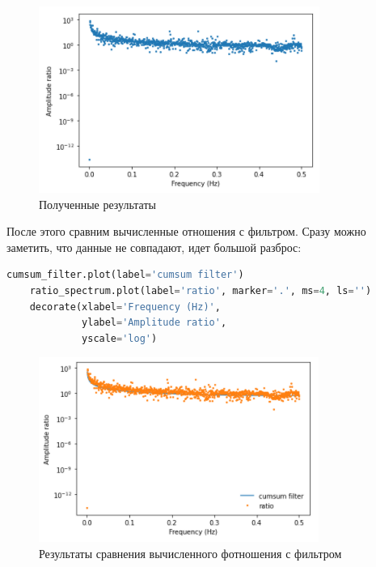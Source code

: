 \documentclass[a4paper]{article}
\begin{document}
            \begin{figure}[H]
                \centering
                \includegraphics{ex_1_new_ratio_spectr.png}
                \caption{Полученные результаты}
                \label{fig:ex_1_new_ratio_spectr}
            \end{figure}
            
            После этого сравним вычисленные отношения с фильтром. Сразу можно заметить, что данные не совпадают, идет большой разброс:
            
\begin{lstlisting}[language=Python, caption= Сравнение вычисленного фотношения с фильтром]
    cumsum_filter.plot(label='cumsum filter')
    ratio_spectrum.plot(label='ratio', marker='.', ms=4, ls='')
    decorate(xlabel='Frequency (Hz)',
             ylabel='Amplitude ratio',
             yscale='log')
\end{lstlisting}
            
            \begin{figure}[H]
                \centering
                \includegraphics{ex_1_new_custom_filret.png}
                \caption{Результаты сравнения вычисленного фотношения с фильтром}
                \label{fig:ex_1_new_custom_filret}
            \end{figure}
            
\end{document}
